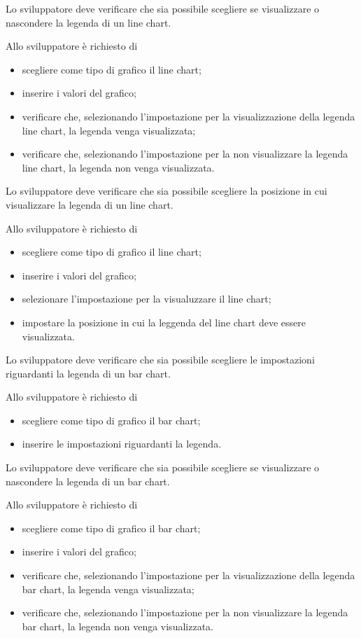 	Lo sviluppatore deve verificare che sia possibile scegliere se visualizzare o nascondere la legenda di un line chart.
			
		Allo sviluppatore è richiesto di
		\begin{itemize}
			\item scegliere come tipo di grafico il line chart;
			\item inserire i valori del grafico;
			\item verificare che, selezionando l'impostazione per la visualizzazione della legenda line chart, la legenda venga visualizzata;
			\item verificare che, selezionando l'impostazione per la non visualizzare la legenda line chart, la legenda non venga visualizzata.
		\end{itemize}

	Lo sviluppatore deve verificare che sia possibile scegliere la posizione in cui visualizzare la legenda di un line chart.
			
		Allo sviluppatore è richiesto di
		\begin{itemize}
			\item scegliere come tipo di grafico il line chart;
			\item inserire i valori del grafico;
			\item selezionare l'impostazione per la visualuzzare il line chart;
			\item impostare la posizione in cui la leggenda del line chart deve essere visualizzata.

		\end{itemize}

	Lo sviluppatore deve verificare che sia possibile scegliere le impostazioni riguardanti la legenda di un bar chart.

		Allo sviluppatore è richiesto di
		\begin{itemize}
			\item scegliere come tipo di grafico il bar chart;
			\item inserire le impostazioni riguardanti la legenda.
		\end{itemize}

	Lo sviluppatore deve verificare che sia possibile scegliere se visualizzare o nascondere la legenda di un bar chart.
		
		Allo sviluppatore è richiesto di
		\begin{itemize}
			\item scegliere come tipo di grafico il bar chart;
			\item inserire i valori del grafico;
			\item verificare che, selezionando l'impostazione per la visualizzazione della legenda bar chart, la legenda venga visualizzata;
			\item verificare che, selezionando l'impostazione per la non visualizzare la legenda bar chart, la legenda non venga visualizzata.
		\end{itemize}

